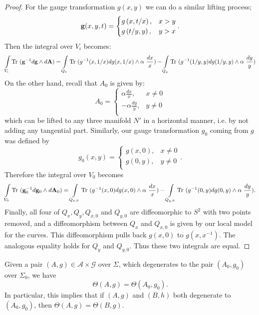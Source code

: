 \begin{proof}
		For the gauge transformation $g(x,y)$ we can do a similar lifting process;
		\begin{equation}
			\mathbf{g}(x,y,t) =\begin{cases}
			g\left(x,t/x\right), & x>y\\
			g\left(t/y,y\right), & y>x\\
			\end{cases}.
		\end{equation}
		Then the integral over $V_i$ becomes:
		\begin{align*}
			\int\limits_{V_i} \text{Tr }(\mathbf{g}^{-1}d\mathbf{g}\wedge d\mathbf{A}) = \int\limits_{Q_x} \text{Tr }(g^{-1}(x,1/x)dg(x,1/x)\wedge \alpha~ \frac{dx}{x}) - \int\limits_{Q_y} \text{Tr }(g^{-1}(1/y,y)dg(1/y,y)\wedge \alpha~ \frac{dy}{y})
		\end{align*}
		On the other hand, recall that $A_0$ is given by:
		\begin{equation}
			A_0 = \begin{cases}
			\alpha \frac{dx}{x}, & x\neq 0\\
			-\alpha \frac{dy}{y}, & y\neq 0\\
			\end{cases}
		\end{equation}
		which can be lifted to any three manifold $N'$ in a horizontal manner, i.e. by not adding any tangential part. Similarly, our gauge transformation $g_0$ coming from $g$ was defined by 
		\begin{equation}
		g_0(x,y) =\begin{cases}
		g\left(x,0\right), & x\neq 0\\
		g\left(0,y\right), & y \neq 0 \\
		\end{cases}.
		\end{equation}
		Therefore the integral over $V_0$ becomes
		\begin{align*}
		\int\limits_{V_0} \text{Tr }(\mathbf{g}_0^{-1}d\mathbf{g}_0\wedge d\mathbf{A}_0) = \int\limits_{Q_{x,0}} \text{Tr }(g^{-1}(x,0)dg(x,0)\wedge \alpha~ \frac{dx}{x}) - \int\limits_{Q_{y,0}} \text{Tr }(g^{-1}(0,y)dg(0,y)\wedge \alpha~ \frac{dy}{y}).
		\end{align*}
		Finally, all four of $Q_x,Q_y, Q_{x,0}$ and $Q_{y,0}$ are diffeomorphic to $S^2$ with two points removed, and a diffeomorphism between $Q_x$ and $Q_{x,0}$ is given by our local model for the curves. This diffeomorphism pulls back $g(x,0)$ to $g(x,x^{-1})$. The analogous equality holds for $Q_y$ and $Q_{y,0}$. Thus these two integrals are equal.
	\end{proof}
	\begin{theorem}
		Given a pair $(A,g) \in \mathcal{A}\times\mathcal{G}$ over $\Sigma$, which degenerates to the pair $(A_0, g_0)$ over $\Sigma_0$, we have
		\begin{equation}
			\Theta(A,g) = \Theta(A_0, g_0).
		\end{equation}
		In particular, this implies that if $(A,g)$ and $(B,h)$ both degenerate to $(A_0,g_0)$, then $\Theta(A,g)=\Theta(B,g)$. 
		\label{t:l=l0}
	\end{theorem}
